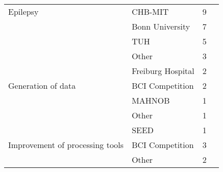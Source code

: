 \begin{tabular}{llrl}
Epilepsy & CHB-MIT &            9 &                                                           \cite{Yan2018, Tsiouris2018, Yuan2018a, Truong2018, Truong2018a, Page2016, Thodoroff2016, Pramod2015, Turner2014} \\
      & Bonn University &            7 &                                                                 \cite{Hussein2018, Ullah2018, Ahmedt-Aristizabal2018, Talathi2017, Acharya2017, Omerhodzic2013, Naderi2010} \\
      & TUH &            5 &                                                                                          \cite{Golmohammadi2017b, Shah2017, Golmohammadi2017a, Golmohammadi2017, Yang2016b} \\
      & Other &            3 &                                                                                                                              \cite{Truong2018, Golmohammadi2017a, Taqi2017} \\
      & Freiburg Hospital &            2 &                                                                                                                                              \cite{Truong2018, Truong2018a} \\
Generation of data & BCI Competition &            2 &                                                                                                                                               \cite{Corley2018, Zhang2018b} \\
      & MAHNOB &            1 &                                                                                                                                                             \cite{Wang2018} \\
      & Other &            1 &                                                                                                                                                       \cite{Schwabedal2018} \\
      & SEED &            1 &                                                                                                                                                             \cite{Wang2018} \\
Improvement of processing tools & BCI Competition &            3 &                                                                                                                                       \cite{Yang2018, Sturm2016, Yang2016a} \\
      & Other &            2 &                                                                                                                                                \cite{Yepes2017, Stober2015} \\

\end{tabular}

